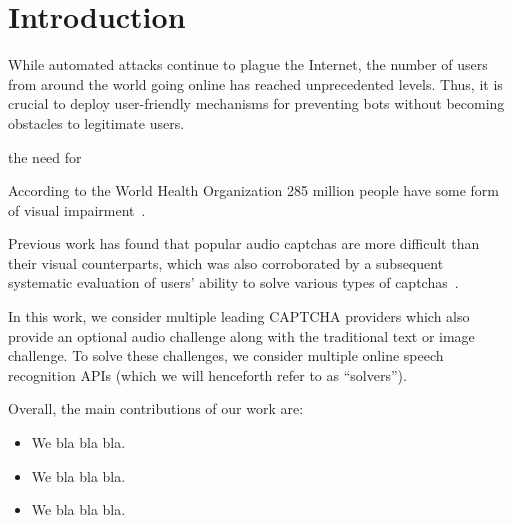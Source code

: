 \section{Introduction}
\label{sec:intro}

While automated attacks continue to plague the Internet, the number
of users from around the world going online has reached unprecedented levels.
Thus, it is crucial to deploy user-friendly mechanisms for preventing bots without
becoming obstacles to legitimate users.

the need for 


According to the World Health Organization 285 million people have some form of visual impairment~\cite{impaired}.

Previous work has found that popular audio captchas are more difficult than their visual counterparts,
which was also corroborated by a subsequent systematic evaluation of users' ability to solve various types of
captchas~\cite{captchas-are-hard}.




In this work, we consider multiple leading CAPTCHA providers which also provide an optional audio 
challenge along with the traditional text or image challenge. To solve these challenges, we consider 
multiple online speech recognition APIs (which we will henceforth refer to as ``solvers'').


Overall, the main contributions of our work are:

\begin{itemize}

\item We bla bla bla.

\item We bla bla bla.

\item We bla bla bla.

\end{itemize}
